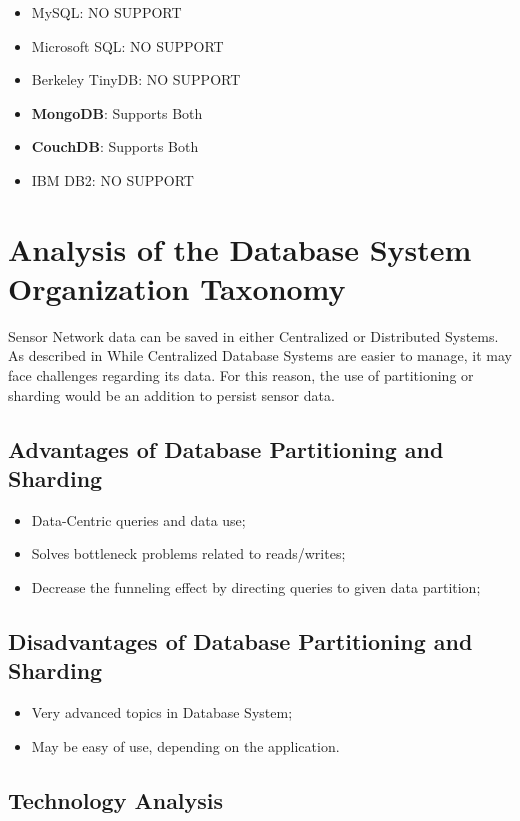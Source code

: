 \begin{itemize}
  \item MySQL: NO SUPPORT
  \item Microsoft SQL: NO SUPPORT
  \item Berkeley TinyDB: NO SUPPORT
  \item \textbf{MongoDB}: Supports Both
  \item \textbf{CouchDB}: Supports Both
  \item IBM DB2: NO SUPPORT
\end{itemize}

\section{Analysis of the Database System Organization Taxonomy}

Sensor Network data can be saved in either Centralized or Distributed Systems.
As described in  While Centralized Database Systems are easier to manage, it may
face challenges regarding its data. For this reason, the use of partitioning or
sharding would be an addition to persist sensor data.

\subsection{Advantages of Database Partitioning and Sharding}

\begin{itemize}
  \item Data-Centric queries and data use;
  \item Solves bottleneck problems related to reads/writes;
  \item Decrease the funneling effect by directing queries to given data
  partition;
\end{itemize}

\subsection{Disadvantages of Database Partitioning and Sharding}

\begin{itemize}
  \item Very advanced topics in Database System;
  \item May be easy of use, depending on the application.
\end{itemize}

\subsection{Technology Analysis}

